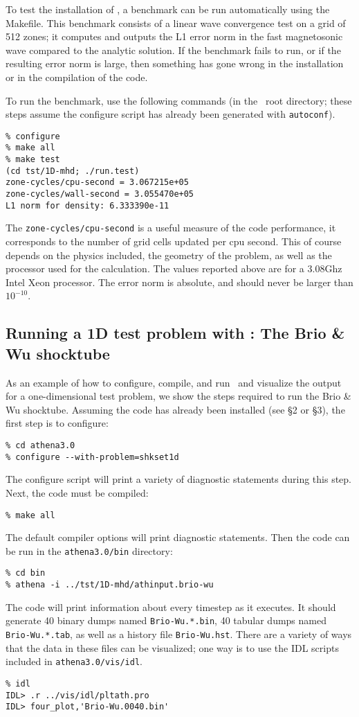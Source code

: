 To test the installation of \ath, a benchmark can be run automatically
using the Makefile.  This benchmark consists of a linear wave convergence
test on a grid of 512 zones; it computes and outputs the L1 error
norm in the fast magnetosonic wave compared to the analytic solution.
If the benchmark fails to run, or if the resulting error norm is large,
then something has gone wrong in the installation or in the compilation
of the code.

To run the benchmark, use the following commands (in the \ath\
root directory; these steps assume the configure script has already been generated with {\tt autoconf}).
\begin{verbatim}
% configure
% make all
% make test
(cd tst/1D-mhd; ./run.test)
zone-cycles/cpu-second = 3.067215e+05
zone-cycles/wall-second = 3.055470e+05
L1 norm for density: 6.333390e-11
\end{verbatim}
The {\tt zone-cycles/cpu-second} is a useful measure of the code performance,
it corresponds to the number of grid cells updated per cpu second.  This of
course depends on the physics included, the geometry of the problem, as well
as the processor used for the calculation.  The values reported above are
for a 3.08Ghz Intel Xeon processor.  The error norm is absolute, and should
never be larger than $10^{-10}$.

\subsection{Running a 1D test problem with \ath: The Brio \& Wu shocktube}

As an example of how to configure, compile, and run \ath\ and visualize
the output for a one-dimensional test problem, we show the steps required 
to run the Brio \& Wu shocktube.
Assuming the code has already been installed (see \S2 or \S3), the first step is
to configure:
\begin{verbatim}
% cd athena3.0
% configure --with-problem=shkset1d
\end{verbatim}
The configure script will print a variety of diagnostic statements during
this step.  Next, the code must be compiled:
\begin{verbatim}
% make all
\end{verbatim}
The default compiler options will print diagnostic statements.  Then
the code can be run in the {\tt athena3.0/bin} directory:
\begin{verbatim}
% cd bin
% athena -i ../tst/1D-mhd/athinput.brio-wu
\end{verbatim}
The code will print information about every timestep as it executes.  It
should generate 40 binary dumps named {\tt Brio-Wu.*.bin}, 40 tabular
dumps named {\tt Brio-Wu.*.tab},
as well as a history file {\tt Brio-Wu.hst}.  There
are a variety of ways that the data in these files can be visualized; one
way is to use the IDL scripts included in {\tt athena3.0/vis/idl}.
\begin{verbatim}
% idl
IDL> .r ../vis/idl/pltath.pro
IDL> four_plot,'Brio-Wu.0040.bin'
\end{verbatim}


